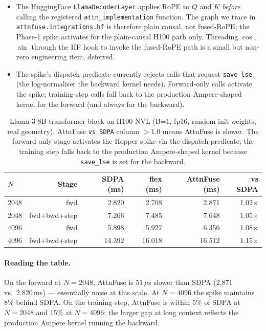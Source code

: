 \begin{itemize}[leftmargin=1.2em,itemsep=1pt]
  \item The HuggingFace \texttt{LlamaDecoderLayer} applies RoPE to
        $Q$ and $K$ \emph{before} calling the registered
        \texttt{attn\_implementation} function. The graph we trace
        in \texttt{attnfuse.integrations.hf} is therefore plain
        causal, not fused-RoPE; the Phase-1 spike activates for the
        plain-causal H100 path only. Threading $\cos$, $\sin$ through
        the HF hook to invoke the fused-RoPE path is a small but
        non-zero engineering item, deferred.
  \item The spike's dispatch predicate currently rejects calls that
        request \texttt{save\_lse} (the log-normaliser the backward
        kernel needs). Forward-only calls activate the spike;
        training-step calls fall back to the production
        Ampere-shaped kernel for the forward (and always for the
        backward).
\end{itemize}

\begin{table}[h]
\centering
\small
\begin{tabular}{lrrrrr}
\toprule
$N$ & Stage & SDPA (ms) & flex (ms) & AttnFuse (ms) & vs SDPA \\
\midrule
2048 & fwd            & 2.820  & 2.708  & 2.871  & 1.02$\times$ \\
2048 & fwd+bwd+step   & 7.266  & 7.485  & 7.648  & 1.05$\times$ \\
4096 & fwd            & 5.898  & 5.927  & 6.356  & 1.08$\times$ \\
4096 & fwd+bwd+step   & 14.392 & 16.018 & 16.512 & 1.15$\times$ \\
\bottomrule
\end{tabular}
\caption{Llama-3-8B transformer block on H100 NVL (B=1, fp16,
random-init weights, real geometry). AttnFuse \texttt{vs SDPA}
column $>1.0$ means AttnFuse is slower. The forward-only stage
activates the Hopper spike via the dispatch predicate; the
training step falls back to the production Ampere-shaped kernel
because \texttt{save\_lse} is set for the backward.}
\label{tab:hopper_e2e}
\end{table}

\paragraph{Reading the table.} On the forward at $N{=}2048$,
AttnFuse is $51\,\mu$s slower than SDPA (2.871 vs.\ 2.820\,ms) ---
essentially noise at this scale. At $N{=}4096$ the spike maintains
8\% behind SDPA. On the training step, AttnFuse is within 5\% of
SDPA at $N{=}2048$ and 15\% at $N{=}4096$; the larger gap at long
context reflects the production Ampere kernel running the backward.

